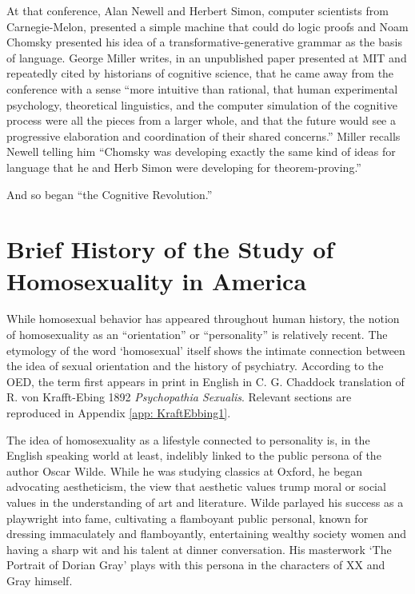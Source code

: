 \begin{refsection}
At that conference, Alan Newell and Herbert Simon, computer scientists from Carnegie-Melon, presented a simple machine that could do logic proofs and Noam Chomsky presented his idea of a transformative-generative grammar as the basis of language. George Miller writes, in an unpublished paper presented at MIT and repeatedly cited by historians of cognitive science, that he came away from the conference with a sense ``more intuitive than rational, that human experimental psychology, theoretical linguistics, and the computer simulation of the cognitive process were all the pieces from a larger whole, and that the future would see a progressive elaboration and coordination of their shared concerns.'' Miller recalls Newell telling him ``Chomsky was developing exactly the same kind of ideas for language that he and Herb Simon were developing for theorem-proving.'' ~\citep{MILLER:1979tt}

And so began ``the Cognitive Revolution.''

\section{Brief History of the Study of Homosexuality in America}
\label{briefhistoryofthestudyofhomosexualityinamerica}

While homosexual behavior has appeared throughout human history, the notion of homosexuality as an ``orientation'' or ``personality'' is relatively recent. The etymology of the word `homosexual' itself shows the intimate connection between the idea of sexual orientation and the history of psychiatry. According to the OED, the term first appears in print in English in C. G. Chaddock translation of R. von Krafft-Ebing 1892 \emph{Psychopathia Sexualis}. Relevant sections are reproduced in Appendix \ref{app: KraftEbbing1}.

The idea of homosexuality as a lifestyle connected to personality is, in the English speaking world at least, indelibly linked to the public persona of the author Oscar Wilde. While he was studying classics at Oxford, he began advocating aestheticism, the view that aesthetic values trump moral or social values in the understanding of art and literature. Wilde parlayed his success as a playwright into fame, cultivating a flamboyant public personal, known for dressing immaculately and flamboyantly, entertaining wealthy society women and having a sharp wit and his talent at dinner conversation. His masterwork `The Portrait of Dorian Gray' plays with this persona in the characters of XX and Gray himself.


\end{refsection}
